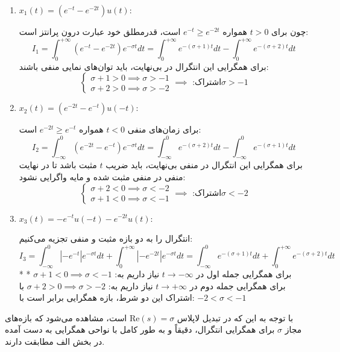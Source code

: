 \begin{enumerate}
    \item $x_1(t) = (e^{-t} - e^{-2t})u(t)$:

    چون برای $t>0$ همواره $e^{-t} \ge e^{-2t}$ است، قدرمطلق خود عبارت درون پرانتز است:
    \[
    I_1 = \int_{0}^{+\infty} (e^{-t} - e^{-2t}) e^{-\sigma t} dt = \int_{0}^{+\infty} e^{-(\sigma + 1)t} dt - \int_{0}^{+\infty} e^{-(\sigma + 2)t} dt
    \]
    برای همگرایی این انتگرال در بی‌نهایت، باید توان‌های نمایی منفی باشند:
    \[
    \begin{cases} \sigma + 1 > 0 \implies \sigma > -1 \\ \sigma + 2 > 0 \implies \sigma > -2 \end{cases} \implies \text{ :اشتراک} \sigma > -1
    \]

    \item $x_2(t) = (e^{-2t} - e^{-t})u(-t)$:

    برای زمان‌های منفی $t<0$ همواره $e^{-2t} \ge e^{-t}$ است:
    \[
    I_2 = \int_{-\infty}^{0} (e^{-2t} - e^{-t}) e^{-\sigma t} dt = \int_{-\infty}^{0} e^{-(\sigma + 2)t} dt - \int_{-\infty}^{0} e^{-(\sigma + 1)t} dt
    \]
    برای همگرایی این انتگرال در منفی بی‌نهایت، باید ضریب $t$ مثبت باشد تا در نهایت منفی در منفی مثبت شده و مایه واگرایی نشود:
    \[
    \begin{cases} \sigma + 2 < 0 \implies \sigma < -2 \\ \sigma + 1 < 0 \implies \sigma < -1 \end{cases} \implies \text{ :اشتراک} \sigma < -2
    \]

    \item $x_3(t) = -e^{-t}u(-t) - e^{-2t}u(t)$:

    انتگرال را به دو بازه مثبت و منفی تجزیه می‌کنیم:
    \[
    I_3 = \int_{-\infty}^{0} |-e^{-t}| e^{-\sigma t} dt + \int_{0}^{+\infty} |-e^{-2t}| e^{-\sigma t} dt = \int_{-\infty}^{0} e^{-(\sigma + 1)t} dt + \int_{0}^{+\infty} e^{-(\sigma + 2)t} dt
    \]
    * برای همگرایی جمله اول در $t \to -\infty$ نیاز داریم به: $\sigma + 1 < 0 \implies \sigma < -1$
    \newline
    * برای همگرایی جمله دوم در $t \to +\infty$ نیاز داریم به: $\sigma + 2 > 0 \implies \sigma > -2$
    \newline
    با اشتراک این دو شرط، بازه همگرایی برابر است با: $-2 < \sigma < -1$
\end{enumerate}

 با توجه به این که در تبدیل لاپلاس $\text{Re}(s) = \sigma$ است، مشاهده می‌شود که بازه‌های مجاز $\sigma$ برای همگرایی انتگرال، دقیقاً و به طور کامل با نواحی همگرایی به دست آمده در بخش الف مطابقت دارند.


